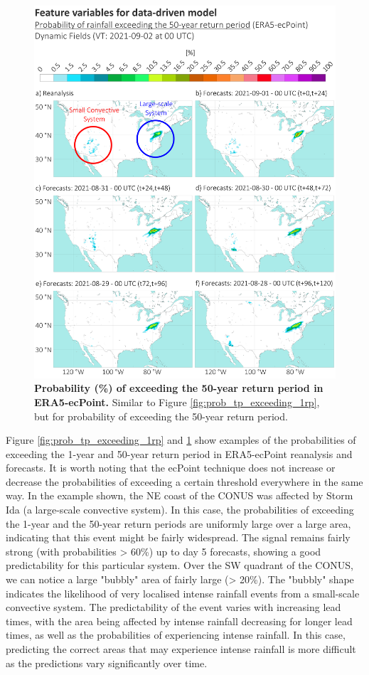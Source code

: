 \begin{figure}[htbp]
\centering
\includegraphics[width=\textwidth]{prob_tp_exceeding_50rp.png}
\caption{\textbf{Probability (\%) of exceeding the 50-year return period in ERA5-ecPoint.} Similar to Figure \ref{fig:prob_tp_exceeding_1rp}, but for probability of exceeding the 50-year return period.}
\label{fig:prob_tp_exceeding_50rp}
\end{figure}

Figure \ref{fig:prob_tp_exceeding_1rp} and \ref{fig:prob_tp_exceeding_50rp} show examples of the probabilities of exceeding the 1-year and 50-year return period in ERA5-ecPoint reanalysis and forecasts. It is worth noting that the ecPoint technique does not increase or decrease the probabilities of exceeding a certain threshold everywhere in the same way. In the example shown, the NE coast of the CONUS was affected by Storm Ida (a large-scale convective system). In this case, the probabilities of exceeding the 1-year and the 50-year return periods are uniformly large over a large area, indicating that this event might be fairly widespread. The signal remains fairly strong (with probabilities > 60\%) up to day 5 forecasts, showing a good predictability for this particular system. Over the SW quadrant of the CONUS, we can notice a large "bubbly" area of fairly large (> 20\%). The "bubbly" shape indicates the likelihood of very localised intense rainfall events from a small-scale convective system. The predictability of the event varies with increasing lead times, with the area being affected by intense rainfall decreasing for longer lead times, as well as the probabilities of experiencing intense rainfall. In this case, predicting the correct areas that may experience intense rainfall is more difficult as the predictions vary significantly over time.



